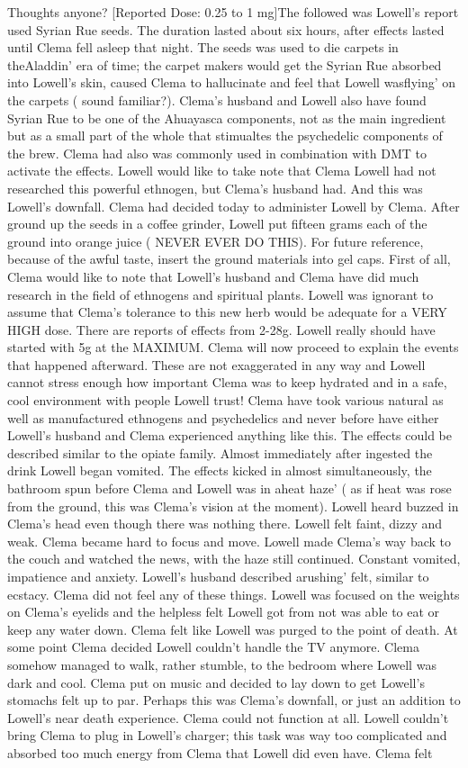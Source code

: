 \documentclass[12pt]{book}
\begin{document}
Thoughts anyone? [Reported Dose: 0.25 to 1 mg]The followed was Lowell's report used Syrian Rue seeds. The duration lasted about six hours, after effects lasted until Clema fell asleep that night. The seeds was used to die carpets in theAladdin' era of time; the carpet makers would get the Syrian Rue absorbed into Lowell's skin, caused Clema to hallucinate and feel that Lowell wasflying' on the carpets ( sound familiar?). Clema's husband and Lowell also have found Syrian Rue to be one of the Ahuayasca components, not as the main ingredient but as a small part of the whole that stimualtes the psychedelic components of the brew. Clema had also was commonly used in combination with DMT to activate the effects. Lowell would like to take note that Clema Lowell had not researched this powerful ethnogen, but Clema's husband had. And this was Lowell's downfall. Clema had decided today to administer Lowell by Clema. After ground up the seeds in a coffee grinder, Lowell put fifteen grams each of the ground into orange juice ( NEVER EVER DO THIS). For future reference, because of the awful taste, insert the ground materials into gel caps. First of all, Clema would like to note that Lowell's husband and Clema have did much research in the field of ethnogens and spiritual plants. Lowell was ignorant to assume that Clema's tolerance to this new herb would be adequate for a VERY HIGH dose. There are reports of effects from 2-28g. Lowell really should have started with 5g at the MAXIMUM. Clema will now proceed to explain the events that happened afterward. These are not exaggerated in any way and Lowell cannot stress enough how important Clema was to keep hydrated and in a safe, cool environment with people Lowell trust! Clema have took various natural as well as manufactured ethnogens and psychedelics and never before have either Lowell's husband and Clema experienced anything like this. The effects could be described similar to the opiate family. Almost immediately after ingested the drink Lowell began vomited. The effects kicked in almost simultaneously, the bathroom spun before Clema and Lowell was in aheat haze' ( as if heat was rose from the ground, this was Clema's vision at the moment). Lowell heard buzzed in Clema's head even though there was nothing there. Lowell felt faint, dizzy and weak. Clema became hard to focus and move. Lowell made Clema's way back to the couch and watched the news, with the haze still continued. Constant vomited, impatience and anxiety. Lowell's husband described arushing' felt, similar to ecstacy. Clema did not feel any of these things. Lowell was focused on the weights on Clema's eyelids and the helpless felt Lowell got from not was able to eat or keep any water down. Clema felt like Lowell was purged to the point of death. At some point Clema decided Lowell couldn't handle the TV anymore. Clema somehow managed to walk, rather stumble, to the bedroom where Lowell was dark and cool. Clema put on music and decided to lay down to get Lowell's stomachs felt up to par. Perhaps this was Clema's downfall, or just an addition to Lowell's near death experience. Clema could not function at all. Lowell couldn't bring Clema to plug in Lowell's charger; this task was way too complicated and absorbed too much energy from Clema that Lowell did even have. Clema felt 
\end{document}

